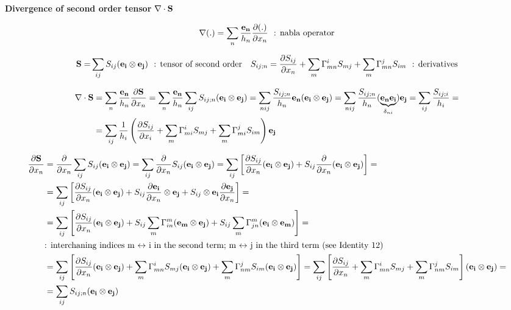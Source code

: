 \documentclass[11pt]{article}
\begin{document}
\begin{landscape}
\newpage

\noindent
{{\bf{Divergence of second order tensor}} $\nabla \cdot {\bf{S}}$}

\begin{align}
\nabla (.) = \sum_n \frac{{\bf{e_n}}}{h_n}\frac{\partial (.)}{\partial x_n} \ \ \mbox{: nabla operator} \nonumber
\end{align}

\begin{align}
{\bf{S}} = &  \sum_{ij} S_{ij} ({\bf{{e_i}} \otimes \bf{{e_j}}}) \ \  \mbox{: tensor of second order} & S_{ij;n} = \frac{\partial S_{ij}}{\partial x_n} + \sum_m \Gamma_{mn}^i S_{mj} + \sum_m \Gamma_{mn}^j S_{im} \ \  \mbox{: derivatives} \nonumber
\end{align}

\begin{align}
\nabla \cdot {\bf{S}} & = \sum_n \frac{{\bf{e_n}}}{h_n}\frac{\partial {\bf{S}}}{\partial x_n} = \sum_n \frac{{\bf{e_n}}}{h_n} \sum_{ij} S_{ij;n} ({\bf{e_i}} \otimes {\bf{e_j}}) = \sum_{nij} \frac{S_{ij;n}}{h_n} {\bf{e_n}}({\bf{e_i}} \otimes {\bf{e_j}}) = \sum_{nij} \frac{S_{ij;n}}{h_n} (\underbrace{{\bf{e_n}}{\bf{e_i}}}_\text{$\delta_{ni}$}){\bf{e_j}} =  \sum_{ij} \frac{S_{ij;i}}{h_i} = \nonumber \\ 
& = \sum_{ij} \frac{1}{h_i} \left(\frac{\partial S_{ij}}{\partial x_i} + \sum_m \Gamma_{mi}^i S_{mj} + \sum_m \Gamma_{mi}^j S_{im} \right){\bf{e_j}}
\end{align}

\begin{align}
\frac{\partial {\bf{S}}}{\partial x_n} & = \frac{\partial}{\partial x_n} \sum_{ij} S_{ij} ({\bf{e_i}} \otimes {\bf{e_j}}) = \sum_{ij} \frac{\partial}{\partial x_n} S_{ij} ({\bf{e_i}} \otimes {\bf{e_j}}) = \sum_{ij} \left[\frac{\partial S_{ij}}{\partial x_n}({\bf{e_i}} \otimes {\bf{e_j}}) + S_{ij}\frac{\partial}{\partial x_n}({\bf{e_i}} \otimes {\bf{e_j}}) \right] = \nonumber \\
& = \sum_{ij} \left[\frac{\partial S_{ij}}{\partial x_n}({\bf{e_i}} \otimes {\bf{e_j}}) + S_{ij}\frac{\partial {\bf{e_i}}}{\partial x_n} \otimes {\bf{e_j}} + S_{ij} \otimes {\bf{e_i}} \frac{\partial {\bf{e_j}}}{\partial x_n}\right] = \\ 
& = \sum_{ij} \left[\frac{\partial S_{ij}}{\partial x_n}({\bf{e_i}} \otimes {\bf{e_j}}) + S_{ij} \sum_m \Gamma_{in}^m ({\bf{e_m}} \otimes {\bf{e_j}}) + S_{ij} \sum_m \Gamma_{jn}^m ({\bf{e_i}} \otimes {\bf{e_m}}) \right] = \nonumber \\
& \mbox{: interchaning indices m $\leftrightarrow$ i in the second term; m $\leftrightarrow$ j in the third term (see Identity 12)} \nonumber \\
& = \sum_{ij} \left[\frac{\partial S_{ij}}{\partial x_n}({\bf{e_i}} \otimes {\bf{e_j}}) + \sum_m \Gamma_{mn}^i S_{mj} ({\bf{e_i}} \otimes {\bf{e_j}}) + \sum_m \Gamma_{nm}^j S_{im} ({\bf{e_i}} \otimes {\bf{e_j}}) \right] = \sum_{ij} \left[\frac{\partial S_{ij}}{\partial x_n} + \sum_m \Gamma_{mn}^i S_{mj} + \sum_m \Gamma_{nm}^j S_{im} \right] ({\bf{e_i}} \otimes {\bf{e_j}}) = \nonumber \\
& = \sum_{ij} S_{ij;n} ({\bf{e_i}} \otimes {\bf{e_j}}) 
\end{align}


\end{landscape}
\end{document}

